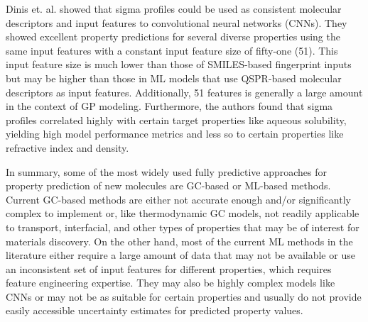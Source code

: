 \documentclass[journal=jacsat,manuscript=article]{achemso}
\begin{document}
Dinis et. al. showed that sigma profiles could be used as consistent molecular descriptors and input features to convolutional neural networks (CNNs). They showed excellent property predictions for several diverse properties using the same input features with a constant input feature size of fifty-one (51). This input feature size is much lower than those of SMILES-based fingerprint inputs but may be higher than those in ML models that use QSPR-based molecular descriptors as input features. Additionally, 51 features is generally a large amount in the context of GP modeling. Furthermore, the authors found that sigma profiles correlated highly with certain target properties like aqueous solubility, yielding high model performance metrics and less so to certain properties like refractive index and density.

In summary, some of the most widely used fully predictive approaches for property prediction of new molecules are GC-based or ML-based methods. Current GC-based methods are either not accurate enough and/or significantly complex to implement or, like thermodynamic GC models, not readily applicable to transport, interfacial, and other types of properties that may be of interest for materials discovery. On the other hand, most of the current ML methods in the literature either require a large amount of data that may not be available or use an inconsistent set of input features for different properties, which requires feature engineering expertise. They may also be highly complex models like CNNs or may not be as suitable for certain properties and usually do not provide easily accessible uncertainty estimates for predicted property values.
\end{document}
